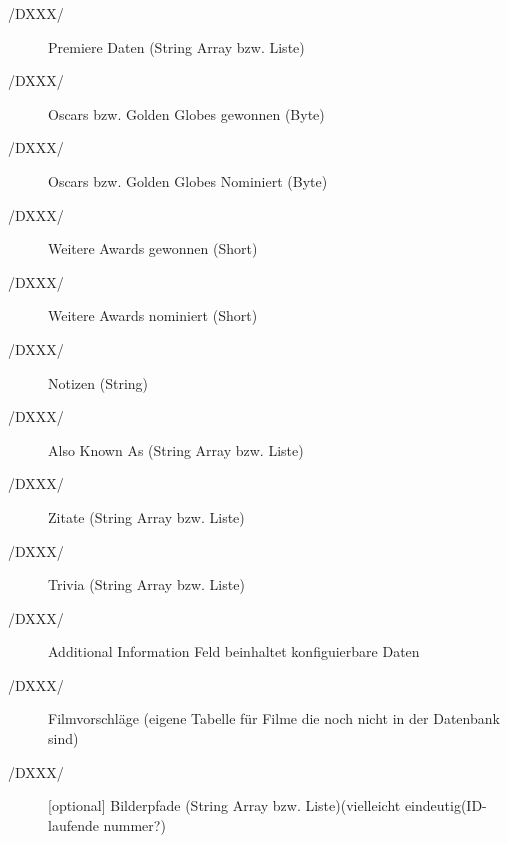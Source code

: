 \begin{description}
			\item[/DXXX/] Premiere Daten (String Array bzw. Liste)
			\item[/DXXX/] Oscars bzw. Golden Globes gewonnen (Byte)
			\item[/DXXX/] Oscars bzw. Golden Globes Nominiert (Byte)
			\item[/DXXX/] Weitere Awards gewonnen (Short)
			\item[/DXXX/] Weitere Awards nominiert (Short)
			\item[/DXXX/] Notizen (String)
			\item[/DXXX/] Also Known As (String Array bzw. Liste)
			\item[/DXXX/] Zitate (String Array bzw. Liste)
			\item[/DXXX/] Trivia (String Array bzw. Liste)
			\item[/DXXX/] Additional Information Feld beinhaltet konfiguierbare Daten
			\item[/DXXX/] Filmvorschläge (eigene Tabelle für Filme die noch nicht in der Datenbank sind)
			\item[/DXXX/][optional] Bilderpfade (String Array bzw. Liste)(vielleicht eindeutig(ID-laufende nummer?)
		\end{description}
